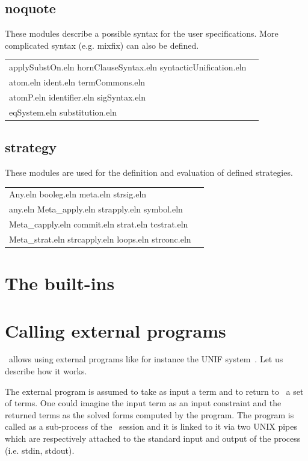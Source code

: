 \subsection{noquote}

These modules describe a possible syntax for the user
specifications. More complicated syntax (e.g. mixfix) can also be
defined.

\begin{tabular}{l@{~~~~~}l}
        applySubstOn.eln   hornClauseSyntax.eln    syntacticUnification.eln \\
        atom.eln           ident.eln               termCommons.eln \\
        atomP.eln          identifier.eln          sigSyntax.eln \\
        eqSystem.eln       substitution.eln
\end{tabular}

\subsection{strategy}

These modules are used for the definition and evaluation of defined
strategies.

\begin{tabular}{l@{~~~~~}l}
        Any.eln          booleg.eln       meta.eln         strsig.eln \\
        any.eln        Meta\_apply.eln   strapply.eln     symbol.eln \\
        Meta\_capply.eln  commit.eln       strat.eln        tcstrat.eln \\
        Meta\_strat.eln   strcapply.eln   loops.eln        strconc.eln
\end{tabular}

\section{The built-ins}\label{les built-in}



\section{Calling external programs}

\elan\ allows using external programs like for instance the UNIF
system~\cite{Ringeissen-RTA97}. Let us describe how it works.

The external program is assumed to take as input a term and to return
to \elan\ a set of terms. One could imagine the input term as an input
constraint and the returned terms as the solved forms computed by the
program. The program is called as a sub-process of the \elan\ session
and it is linked to it via two UNIX pipes which are respectively
attached to the standard input and output of the process (i.e. stdin,
stdout). 

